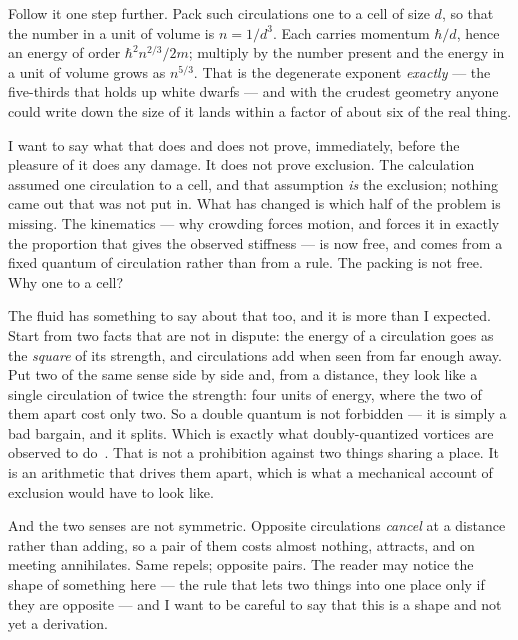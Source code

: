\documentclass[fontsize=11pt,paper=a4,pagesize=auto,parskip=half-]{scrbook}
\begin{document}
Follow it one step further. Pack such circulations one to a cell of size $d$, so that the number in a unit of volume is $n = 1/d^{3}$. Each carries momentum $\hbar/d$, hence an energy of order $\hbar^{2}n^{2/3}/2m$; multiply by the number present and the energy in a unit of volume grows as $n^{5/3}$. That is the degenerate exponent \emph{exactly} --- the five-thirds that holds up white dwarfs --- and with the crudest geometry anyone could write down the size of it lands within a factor of about six of the real thing.

I want to say what that does and does not prove, immediately, before the pleasure of it does any damage. It does not prove exclusion. The calculation assumed one circulation to a cell, and that assumption \emph{is} the exclusion; nothing came out that was not put in. What has changed is which half of the problem is missing. The kinematics --- why crowding forces motion, and forces it in exactly the proportion that gives the observed stiffness --- is now free, and comes from a fixed quantum of circulation rather than from a rule. The packing is not free. Why one to a cell?

The fluid has something to say about that too, and it is more than I expected. Start from two facts that are not in dispute: the energy of a circulation goes as the \emph{square} of its strength, and circulations add when seen from far enough away. Put two of the same sense side by side and, from a distance, they look like a single circulation of twice the strength: four units of energy, where the two of them apart cost only two. So a double quantum is not forbidden --- it is simply a bad bargain, and it splits. Which is exactly what doubly-quantized vortices are observed to do~\cite{shin2004}. That is not a prohibition against two things sharing a place. It is an arithmetic that drives them apart, which is what a mechanical account of exclusion would have to look like.

And the two senses are not symmetric. Opposite circulations \emph{cancel} at a distance rather than adding, so a pair of them costs almost nothing, attracts, and on meeting annihilates. Same repels; opposite pairs. The reader may notice the shape of something here --- the rule that lets two things into one place only if they are opposite --- and I want to be careful to say that this is a shape and not yet a derivation.
\end{document}
